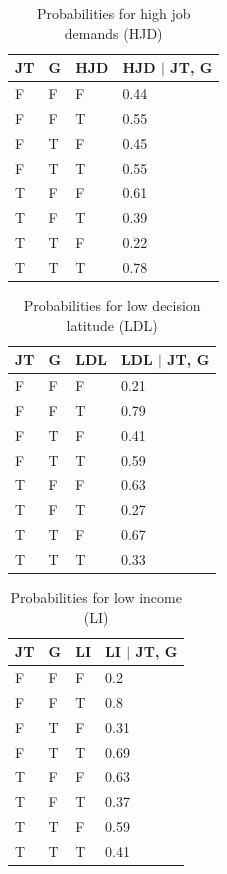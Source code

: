 \begin{table}
\centering
\caption{Probabilities for high job demands (HJD)}\label{tab1}
\begin{tabular}{p{1.2cm} p{1.2cm} p{1.2cm} p{1.5cm} }
\hline
JT & G & HJD & HJD $\mid$ JT, G \\
\hline
F &	F &	F &	0.44\\
F &	F &	T &	0.55\\
F &	T &	F &	0.45\\
F &	T &	T &	0.55\\
T &	F &	F &	0.61\\
T &	F &	T &	0.39\\
T &	T &	F &	0.22\\
T &	T &	T &	0.78\\
\hline
\end{tabular}
\end{table}

\begin{table}
\centering
\caption{Probabilities for low decision latitude (LDL)}\label{tab1}
\begin{tabular}{p{1.2cm} p{1.2cm} p{1.2cm} p{1.5cm} }
\hline
JT &  G & LDL & LDL $\mid$ JT, G\\
\hline
F &	F &	F &	0.21\\
F &	F &	T &	0.79\\
F &	T &	F &	0.41\\
F &	T &	T &	0.59\\
T &	F &	F &	0.63\\
T &	F &	T &	0.27\\
T &	T &	F &	0.67\\
T &	T &	T &	0.33\\
\hline
\end{tabular}
\end{table}


\begin{table}
\centering
\caption{Probabilities for low income (LI)}\label{tab1}
\begin{tabular}{p{1.2cm} p{1.2cm} p{1.2cm} p{1.5cm} }
\hline
JT & G &  LI & LI $\mid$ JT, G \\
\hline
F &	F &	F &	0.2\\
F &	F &	T &	0.8\\
F &	T &	F &	0.31\\
F &	T &	T &	0.69\\
T &	F &	F &	0.63\\
T &	F &	T &	0.37\\
T &	T &	F &	0.59\\
T &	T &	T &	0.41\\

\hline
\end{tabular}
\end{table}

